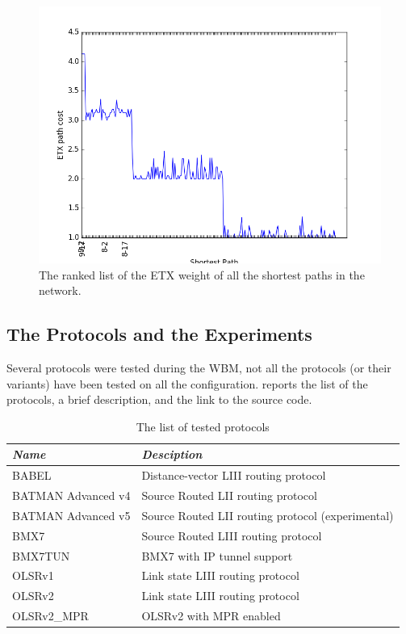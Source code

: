 \documentclass[10pt,onecolumn]{paper}
\begin{document}
\begin{figure}[!htb]
  \centering
  \includegraphics[width=\linewidth]{images/route_lenght_distribution.png}
  \caption{The ranked list of the ETX weight of all the shortest paths in the
    network.} 
  \label{fig:ETXrank}
\end{figure}

\subsection{The Protocols and the Experiments}

Several protocols were tested during the WBM, not all the protocols (or their
variants) have been tested on all the configuration. 
reports the list of the protocols, a brief description, and the link to the
source code. 

\begin{table}
    \centering
    \begin{tabular}{ll}
        \emph{Name} & \emph{Desciption} \\
        \midrule
        BABEL & Distance-vector LIII routing protocol \\
        BATMAN Advanced v4 & Source Routed LII routing protocol \\
        BATMAN Advanced v5 & Source Routed LII routing protocol (experimental)\\
        BMX7  & Source Routed LIII routing protocol \\
        BMX7TUN   & BMX7 with IP tunnel support\\
        OLSRv1 &  Link state LIII routing protocol\\
        OLSRv2 &  Link state LIII routing protocol\\
        OLSRv2\_MPR  & OLSRv2 with MPR enabled\\
        \bottomrule
    \end{tabular}
    \caption{The list of tested protocols}
    \label{tab:protocols}
\end{table}
\end{document}
